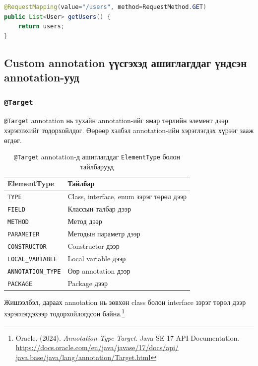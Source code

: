 \begin{lstlisting}[language=Java, caption={Full annotation жишээ}, label={lst:full-annotation}]
@RequestMapping(value="/users", method=RequestMethod.GET)
public List<User> getUsers() {
    return users;
}
\end{lstlisting}

\subsection{Custom annotation үүсгэхэд ашиглагддаг үндсэн annotation-ууд}

\subsubsection{\texttt{@Target}}

\texttt{@Target} annotation нь тухайн annotation-ийг ямар төрлийн элемент дээр хэрэглэхийг тодорхойлдог. Өөрөөр хэлбэл annotation-ийн хэрэглэгдэх хүрээг зааж өгдөг.

\begin{table}[H]
\centering
\small
\setlength{\tabcolsep}{4pt}
\caption{\texttt{@Target} annotation-д ашиглагддаг \texttt{ElementType} болон тайлбарууд}
\label{tab:elementtype}
\begin{tabularx}{\textwidth}{|L{0.26\textwidth}|Y|}
\hline
\textbf{ElementType} & \textbf{Тайлбар} \\
\hline
\texttt{TYPE} & Class, interface, enum зэрэг төрөл дээр \\
\hline
\texttt{FIELD} & Классын талбар дээр \\
\hline
\texttt{METHOD} & Метод дээр \\
\hline
\texttt{PARAMETER} & Методын параметр дээр \\
\hline
\texttt{CONSTRUCTOR} & Constructor дээр \\
\hline
\texttt{LOCAL\_VARIABLE} & Local variable дээр \\
\hline
\texttt{ANNOTATION\_TYPE} & Өөр annotation дээр \\
\hline
\texttt{PACKAGE} & Package дээр \\
\hline
\end{tabularx}
\end{table}

Жишээлбэл, дараах annotation нь зөвхөн class болон interface зэрэг төрөл дээр хэрэглэгдэхээр тодорхойлогдсон байна.\footnote{Oracle. (2024). \textit{Annotation Type Target}.
Java SE 17 API Documentation.
\url{https://docs.oracle.com/en/java/javase/17/docs/api/
java.base/java/lang/annotation/Target.html}}

